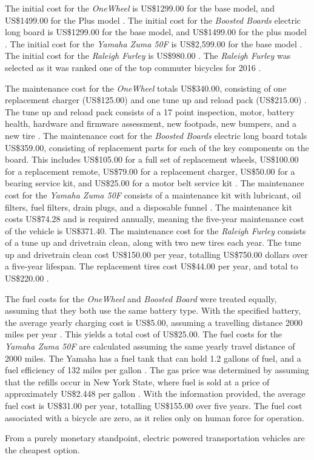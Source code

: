 The initial cost for the \textit{OneWheel} is US\$1299.00 for the base model, and US\$1499.00 for the Plus model \cite{wheelcost}.	
The initial cost for the \textit{Boosted Boards} electric long board is US\$1299.00 for the base model, and US\$1499.00 for the plus model \cite{boardcost}.
The initial cost for the \textit{Yamaha Zuma 50F} is US\$2,599.00 for the base model \cite{Yamaha}.
The initial cost for the \textit{Raleigh Furley} is US\$980.00 \cite{Raleigh}. 
The \textit{Raleigh Furley} was selected as it was ranked one of the top commuter bicycles for 2016 \cite{BikeMagazine}.
\par
The maintenance cost for the \textit{OneWheel} totals US\$340.00, consisting of one replacement charger (US\$125.00) and one tune up and reload pack (US\$215.00) \cite{wheelcost}.
The tune up and reload pack consists of a 17 point inspection, motor, battery health, hardware and firmware assessment, new footpads, new bumpers, and a new tire \cite{wheelcost}.
The maintenance cost for the \textit{Boosted Boards} electric long board totals US\$359.00, consisting of replacement parts for each of the key components on the board. This includes US\$105.00 for a full set of replacement wheels, US\$100.00 for a replacement remote, US\$79.00 for a replacement charger, US\$50.00 for a bearing service kit, and US\$25.00 for a motor belt service kit \cite{boardcost}.
The maintenance cost for the \textit{Yamaha Zuma 50F} consists of a maintenance kit with lubricant, oil filters, fuel filters, drain plugs, and a disposable funnel \cite{YamahaMaintenance}. 
The maintenance kit costs US\$74.28 and is required annually, meaning the five-year maintenance cost of the vehicle is US\$371.40.
The maintenance cost for the \textit{Raleigh Furley} consists of a tune up and drivetrain clean, along with two new tires each year. 
The tune up and drivetrain clean cost US\$150.00 per year, totalling US\$750.00 dollars over a five-year lifespan\cite{bikerepair}. 
The replacement tires cost US\$44.00 per year, and total to US\$220.00 \cite{CanadianTire}.
\par
The fuel costs for the \textit{OneWheel} and \textit{Boosted Board} were treated equally, assuming that they both use the same battery type. With the specified battery, the average yearly charging cost is US\$5.00, assuming a travelling distance 2000 miles per year \cite{boostedkickstart}. 
This yields a total cost of US\$25.00.
The fuel costs for the \textit{Yamaha Zuma 50F} are calculated assuming the same yearly travel distance of 2000 miles.
The Yamaha has a fuel tank that can hold 1.2 gallons of fuel, and a fuel efficiency of 132 miles per gallon \cite{Yamaha}.
The gas price was determined by assuming that the refills occur in New York State, where fuel is sold at a price of approximately US\$2.448 per gallon \cite{gasprice}.
With the information provided, the average fuel cost is US\$31.00 per year, totalling US\$155.00 over five years.
The fuel cost associated with a bicycle are zero, as it relies only on human force for operation.
\par
From a purely monetary standpoint, electric powered transportation vehicles are the cheapest option.

